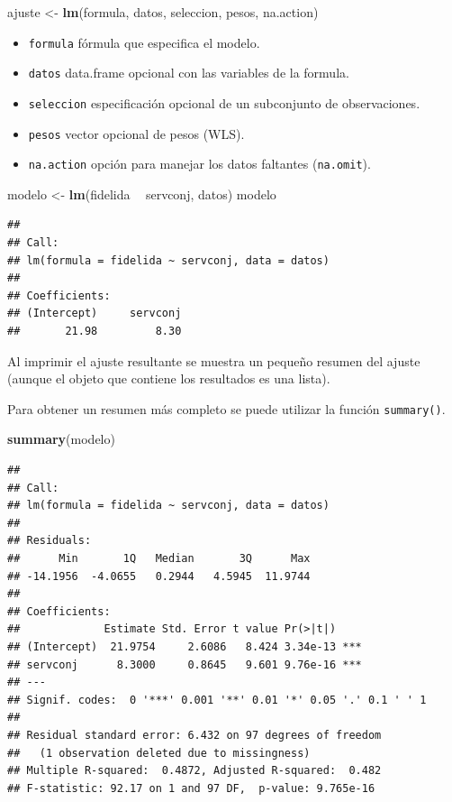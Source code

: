 \documentclass[]{book}
\newenvironment{Shaded}{\begin{snugshade}}{\end{snugshade}}
\newcommand{\KeywordTok}[1]{\textcolor[rgb]{0.13,0.29,0.53}{\textbf{#1}}}
\newcommand{\NormalTok}[1]{#1}
\newcommand{\OperatorTok}[1]{\textcolor[rgb]{0.81,0.36,0.00}{\textbf{#1}}}
\newcommand{\StringTok}[1]{\textcolor[rgb]{0.31,0.60,0.02}{#1}}
\providecommand{\tightlist}{%
  \setlength{\itemsep}{0pt}\setlength{\parskip}{0pt}}
\begin{document}
\begin{Shaded}
\begin{Highlighting}[]
\NormalTok{ajuste <-}\StringTok{ }\KeywordTok{lm}\NormalTok{(formula, datos, seleccion, pesos, na.action)}
\end{Highlighting}
\end{Shaded}

\begin{itemize}
\tightlist
\item
  \texttt{formula} fórmula que especifica el modelo.
\item
  \texttt{datos} data.frame opcional con las variables de la formula.
\item
  \texttt{seleccion} especificación opcional de un subconjunto de observaciones.
\item
  \texttt{pesos} vector opcional de pesos (WLS).
\item
  \texttt{na.action} opción para manejar los datos faltantes (\texttt{na.omit}).
\end{itemize}

\begin{Shaded}
\begin{Highlighting}[]
\NormalTok{modelo <-}\StringTok{ }\KeywordTok{lm}\NormalTok{(fidelida }\OperatorTok{~}\StringTok{ }\NormalTok{servconj, datos)}
\NormalTok{modelo}
\end{Highlighting}
\end{Shaded}

\begin{verbatim}
## 
## Call:
## lm(formula = fidelida ~ servconj, data = datos)
## 
## Coefficients:
## (Intercept)     servconj  
##       21.98         8.30
\end{verbatim}

Al imprimir el ajuste resultante se muestra un pequeño resumen del ajuste (aunque el objeto que contiene los resultados es una lista).

Para obtener un resumen más completo se puede utilizar la función \texttt{summary()}.

\begin{Shaded}
\begin{Highlighting}[]
\KeywordTok{summary}\NormalTok{(modelo)}
\end{Highlighting}
\end{Shaded}

\begin{verbatim}
## 
## Call:
## lm(formula = fidelida ~ servconj, data = datos)
## 
## Residuals:
##      Min       1Q   Median       3Q      Max 
## -14.1956  -4.0655   0.2944   4.5945  11.9744 
## 
## Coefficients:
##             Estimate Std. Error t value Pr(>|t|)    
## (Intercept)  21.9754     2.6086   8.424 3.34e-13 ***
## servconj      8.3000     0.8645   9.601 9.76e-16 ***
## ---
## Signif. codes:  0 '***' 0.001 '**' 0.01 '*' 0.05 '.' 0.1 ' ' 1
## 
## Residual standard error: 6.432 on 97 degrees of freedom
##   (1 observation deleted due to missingness)
## Multiple R-squared:  0.4872, Adjusted R-squared:  0.482 
## F-statistic: 92.17 on 1 and 97 DF,  p-value: 9.765e-16
\end{verbatim}
\end{document}
